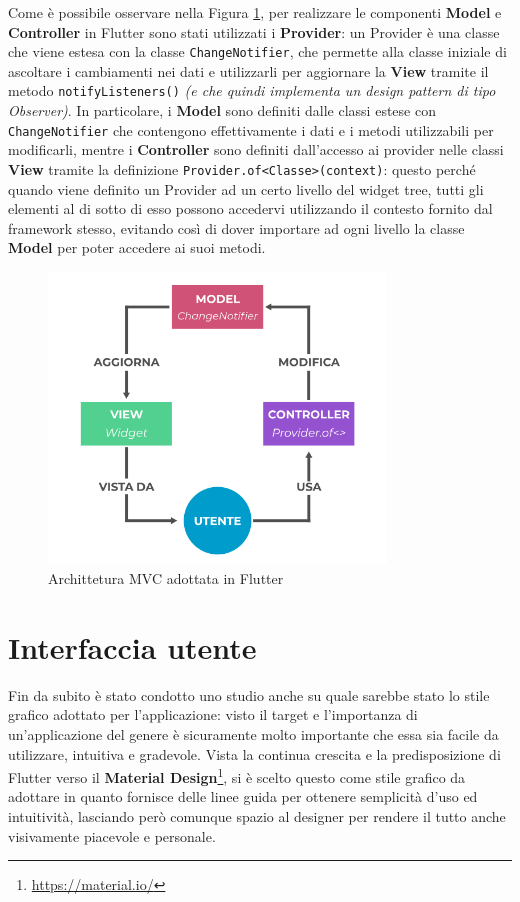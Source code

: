 Come è possibile osservare nella Figura \ref{fig:MVC_Flutter}, per realizzare le componenti \textbf{Model} e \textbf{Controller} in Flutter sono stati utilizzati i \textbf{Provider}: un Provider è una classe che viene estesa con la classe \texttt{ChangeNotifier}, che permette alla classe iniziale di ascoltare i cambiamenti nei dati e utilizzarli per aggiornare la \textbf{View} tramite il metodo \texttt{notifyListeners()} \textit{(e che quindi implementa un design pattern di tipo Observer)}. In particolare, i \textbf{Model} sono definiti dalle classi estese con \texttt{ChangeNotifier} che contengono effettivamente i dati e i metodi utilizzabili per modificarli, mentre i \textbf{Controller} sono definiti dall'accesso ai provider nelle classi \textbf{View} tramite la definizione \texttt{Provider.of<Classe>(context)}: questo perché quando viene definito un Provider ad un certo livello del widget tree, tutti gli elementi al di sotto di esso possono accedervi utilizzando il contesto fornito dal framework stesso, evitando così di dover importare ad ogni livello la classe \textbf{Model} per poter accedere ai suoi metodi.

\begin{figure}[h]
\centering
\includegraphics[width=0.8\textwidth]{img/MVC_Flutter}
\caption{Archittetura MVC adottata in Flutter}
\label{fig:MVC_Flutter}
\end{figure}

\section{Interfaccia utente}
Fin da subito è stato condotto uno studio anche su quale sarebbe stato lo stile grafico adottato per l'applicazione: visto il target e l'importanza di un'applicazione del genere è sicuramente molto importante che essa sia facile da utilizzare, intuitiva e gradevole.
Vista la continua crescita e la predisposizione di Flutter verso il \textbf{Material Design}\footnote{\url{https://material.io/}}, si è scelto questo come stile grafico da adottare in quanto fornisce delle linee guida per ottenere semplicità d'uso ed intuitività, lasciando però comunque spazio al designer per rendere il tutto anche visivamente piacevole e personale.

